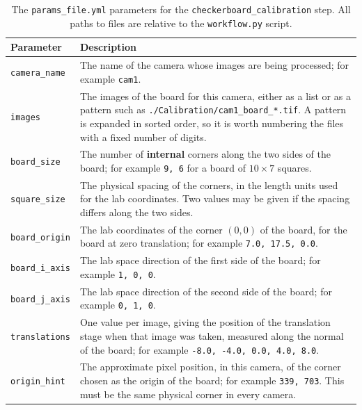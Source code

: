 \documentclass[10pt,a4paper]{article}
\begin{document}
\begin{table}
	\centering
	\caption{The \texttt{params\_file.yml} parameters for the \texttt{checkerboard\_calibration} step. All paths to files are relative to the \texttt{workflow.py} script. \label{tab:checkerboard_paramsfile}}
	\begin{tabular}{l m{10cm}}
		\hline
		Parameter & Description\\[.2cm]
		\hline

		\texttt{camera\_name} & The name of the camera whose images are being processed; for example \texttt{cam1}. \\[.2cm]

		\texttt{images} & The images of the board for this camera, either as a list or as a pattern such as \texttt{./Calibration/cam1\_board\_*.tif}. A pattern is expanded in sorted order, so it is worth numbering the files with a fixed number of digits. \\[.2cm]

		\texttt{board\_size} & The number of \textbf{internal} corners along the two sides of the board; for example \texttt{9, 6} for a board of $10 \times 7$ squares. \\[.2cm]

		\texttt{square\_size} & The physical spacing of the corners, in the length units used for the lab coordinates. Two values may be given if the spacing differs along the two sides. \\[.2cm]

		\texttt{board\_origin} & The lab coordinates of the corner $(0,0)$ of the board, for the board at zero translation; for example \texttt{7.0, 17.5, 0.0}. \\[.2cm]

		\texttt{board\_i\_axis} & The lab space direction of the first side of the board; for example \texttt{1, 0, 0}. \\[.2cm]

		\texttt{board\_j\_axis} & The lab space direction of the second side of the board; for example \texttt{0, 1, 0}. \\[.2cm]

		\texttt{translations} & One value per image, giving the position of the translation stage when that image was taken, measured along the normal of the board; for example \texttt{-8.0, -4.0, 0.0, 4.0, 8.0}. \\[.2cm]

		\texttt{origin\_hint} & The approximate pixel position, in this camera, of the corner chosen as the origin of the board; for example \texttt{339, 703}. This must be the same physical corner in every camera. \\[.2cm]


\end{tabular}
\end{table}
\end{document}
